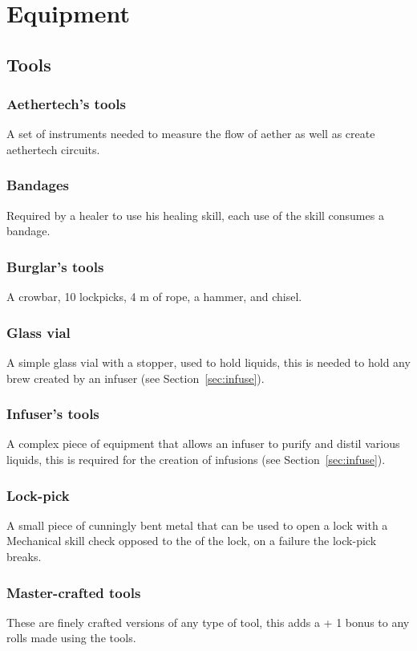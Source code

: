 \documentclass[a4paper,11pt,oneside]{book}
\newcommand{\textlf}[1]{\textbf{\titlecap{#1}}}
\begin{document}
\section{Equipment}
\subsection{Tools}

\subsubsection{Aethertech's tools}
A set of instruments needed to measure the flow of aether as well as create aethertech circuits.

\subsubsection{Bandages}
Required by a healer to use his healing skill, each use of the skill consumes a bandage.

\subsubsection{Burglar's tools}
A crowbar, 10 lockpicks, 4 m of rope, a hammer, and chisel.

\subsubsection{Glass vial}
A simple glass vial with a stopper, used to hold liquids, this is needed to hold any brew created by an infuser (see Section~\ref{sec:infuse}).

\subsubsection{Infuser's tools}
A complex piece of equipment that allows an infuser to purify and distil various liquids, this is required for the creation of infusions (see Section~\ref{sec:infuse}).

\subsubsection{Lock-pick}
A small piece of cunningly bent metal that can be used to open a lock with a Mechanical skill check opposed to the \textlf{difficulty} of the lock, on a failure the lock-pick breaks.

\subsubsection{Master-crafted tools}
These are finely crafted versions of any type of tool, this adds a + 1 bonus to any rolls made using the tools.
\end{document}

